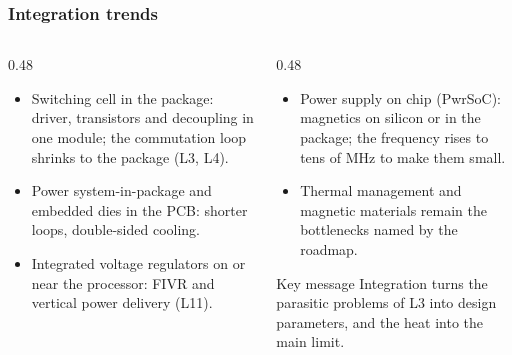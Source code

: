 \begin{frame}
	\frametitle{Integration trends}
	\begin{columns}[T]
		\begin{column}{0.48\textwidth}
			\small
			\begin{itemize}
				\item Switching cell in the package: driver, transistors and decoupling in one module; the commutation loop shrinks to the package (L3, L4).
				\item Power system-in-package and embedded dies in the PCB: shorter loops, double-sided cooling.
				\item Integrated voltage regulators on or near the processor: FIVR and vertical power delivery (L11).
			\end{itemize}
		\end{column}
		\begin{column}{0.48\textwidth}
			\small
			\begin{itemize}
				\item Power supply on chip (PwrSoC): magnetics on silicon or in the package; the frequency rises to tens of MHz to make them small.
				\item Thermal management and magnetic materials remain the bottlenecks named by the roadmap.
			\end{itemize}
			\begin{block}{Key message}
				Integration turns the parasitic problems of L3 into design parameters, and the heat into the main limit.
			\end{block}
		\end{column}
	\end{columns}
\end{frame}

